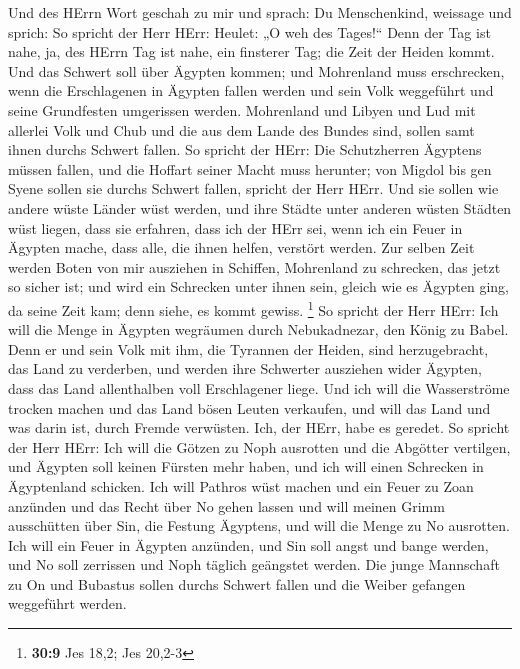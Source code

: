  Und des HErrn Wort geschah zu mir und sprach:
 Du Menschenkind, weissage und sprich: So spricht der Herr
HErr: Heulet: „O weh des Tages!{}``  Denn der Tag ist
nahe, ja, des HErrn Tag ist nahe, ein finsterer Tag; die Zeit der Heiden
kommt.  Und das Schwert soll über Ägypten kommen; und
Mohrenland muss erschrecken, wenn die Erschlagenen in Ägypten fallen
werden und sein Volk weggeführt und seine Grundfesten umgerissen werden.
 Mohrenland und Libyen und Lud mit allerlei Volk und Chub
und die aus dem Lande des Bundes sind, sollen samt ihnen durchs Schwert
fallen.  So spricht der HErr: Die Schutzherren Ägyptens
müssen fallen, und die Hoffart seiner Macht muss herunter; von Migdol
bis gen Syene sollen sie durchs Schwert fallen, spricht der Herr HErr.
 Und sie sollen wie andere wüste Länder wüst werden, und
ihre Städte unter anderen wüsten Städten wüst liegen, 
dass sie erfahren, dass ich der HErr sei, wenn ich ein Feuer in Ägypten
mache, dass alle, die ihnen helfen, verstört werden.  Zur
selben Zeit werden Boten von mir ausziehen in Schiffen, Mohrenland zu
schrecken, das jetzt so sicher ist; und wird ein Schrecken unter ihnen
sein, gleich wie es Ägypten ging, da seine Zeit kam; denn siehe, es
kommt gewiss. \footnote{\textbf{30:9} Jes 18,2; Jes 20,2-3}
 So spricht der Herr HErr: Ich will die Menge in Ägypten
wegräumen durch Nebukadnezar, den König zu Babel.  Denn
er und sein Volk mit ihm, die Tyrannen der Heiden, sind herzugebracht,
das Land zu verderben, und werden ihre Schwerter ausziehen wider
Ägypten, dass das Land allenthalben voll Erschlagener liege.
 Und ich will die Wasserströme trocken machen und das
Land bösen Leuten verkaufen, und will das Land und was darin ist, durch
Fremde verwüsten. Ich, der HErr, habe es geredet.  So
spricht der Herr HErr: Ich will die Götzen zu Noph ausrotten und die
Abgötter vertilgen, und Ägypten soll keinen Fürsten mehr haben, und ich
will einen Schrecken in Ägyptenland schicken.  Ich will
Pathros wüst machen und ein Feuer zu Zoan anzünden und das Recht über No
gehen lassen  und will meinen Grimm ausschütten über Sin,
die Festung Ägyptens, und will die Menge zu No ausrotten.
 Ich will ein Feuer in Ägypten anzünden, und Sin soll
angst und bange werden, und No soll zerrissen und Noph täglich geängstet
werden.  Die junge Mannschaft zu On und Bubastus sollen
durchs Schwert fallen und die Weiber gefangen weggeführt werden.
